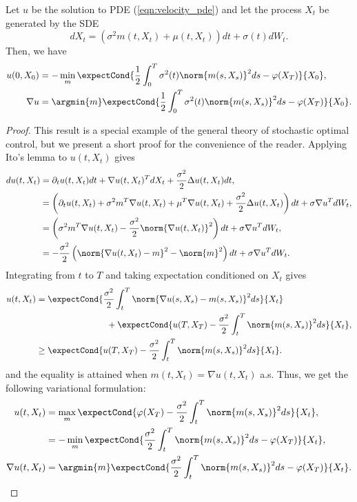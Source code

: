 \begin{lemma}\label{lemma_app:oc_optimization}
    Let $u$ be the solution to PDE (\ref{eqn:velocity_pde}) and let the process $X_t$ be generated by the SDE
    \begin{equation}\label{eqn_app:oc_diffusion}
         dX_t = \left(\sigma^2 m(t,X_t)+\mu(t,X_t)\right)dt+\sigma(t) dW_t.
    \end{equation}
    Then, we have 
\begin{align*}
    u(0,X_0) &= - \min_m \expectCond{\frac{1}{2}\int_0^T\sigma^2(t)\norm{m(s,X_s)}^2ds-\varphi(X_T)}{X_0},\\
    \nabla u &= \argmin{m} \expectCond{\frac{1}{2}\int_0^T\sigma^2(t)\norm{m(s,X_s)}^2ds-\varphi(X_T)}{X_0}.
\end{align*}
\end{lemma}
\begin{proof}
This result is a special example of the general theory of stochastic optimal control, but we present a short proof for the convenience of the reader.
    Applying Ito's lemma to $u(t,X_t)$ gives
\begin{align*}
    du(t,X_t) &= \partial_t u(t,X_t)dt+\nabla u(t,X_t)^TdX_t+\frac{\sigma^2}{2}\Delta u(t,X_t)dt,\\
    & = \left(\partial_t u(t,X_t)+\sigma^2 m^T\nabla u(t,X_t)+\mu^T\nabla u(t,X_t)+\frac{\sigma^2}{2}\Delta u(t,X_t)\right)dt+\sigma\nabla u^TdW_t,\\
    &= \left(\sigma^2 m^T\nabla u(t,X_t)-\frac{\sigma^2}{2}\norm{\nabla u(t,X_t)}^2\right)dt+\sigma\nabla u^TdW_t,\\
    &= -\frac{\sigma^2}{2}\left(\norm{\nabla u(t,X_t)-m}^2 -\norm{m}^2\right)dt+\sigma\nabla u^TdW_t.
\end{align*}
Integrating from $t$ to $T$ and taking expectation conditioned on $X_t$ gives
\begin{align*}
    u(t,X_t) &= \expectCond{\frac{\sigma^2}{2}\int_t^T\norm{\nabla u(s,X_s)-m(s,X_s)}^2ds}{X_t}\\
    &\qquad\qquad\qquad\qquad+ \expectCond{u(T,X_T) - \frac{\sigma^2}{2}\int_t^T\norm{m(s,X_s)}^2ds}{X_t},\\
    &\ge \expectCond{u(T,X_T) - \frac{\sigma^2}{2}\int_t^T\norm{m(s,X_s)}^2ds}{X_t}.\\
\end{align*}
and the equality is attained when $m(t,X_t)=\nabla u(t,X_t)$ a.s.
Thus, we get the following variational formulation:
\begin{align*}
    u(t,X_t) &= \max_m \expectCond{\varphi(X_T) - \frac{\sigma^2}{2}\int_t^T\norm{m(s,X_s)}^2ds}{X_t},\\
    &= - \min_m \expectCond{\frac{\sigma^2}{2}\int_t^T\norm{m(s,X_s)}^2ds-\varphi(X_T)}{X_t},\\
    \nabla u(t,X_t) &= \argmin{m} \expectCond{\frac{\sigma^2}{2}\int_t^T\norm{m(s,X_s)}^2ds-\varphi(X_T)}{X_t}.
\end{align*}
\end{proof}

